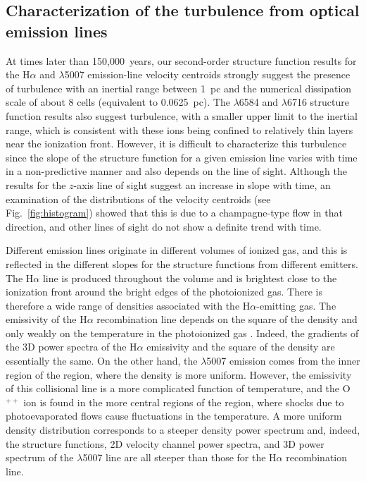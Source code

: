 \documentclass[useAMS,usenatbib]{mn2e}
\begin{document}
\subsection{Characterization of the turbulence from optical emission
  lines}
\label{subsec:charac}
At times later than 150,000~years, our second-order structure function
results for the H$\alpha$ and \oiii$\lambda$5007
emission-line velocity centroids strongly suggest the presence of
turbulence with an inertial range between 1~pc and the numerical
dissipation scale of about 8 cells (equivalent to 0.0625~pc). The
\nii$\lambda$6584 and
\sii$\lambda$6716 structure function results also suggest turbulence, with a smaller upper limit to the inertial range,
which is consistent with these ions being confined to relatively thin
layers near the ionization front. However, it is difficult
to characterize this turbulence since the slope of the structure
function for a given emission line varies with time in a
non-predictive manner and also depends on the line of sight. Although
the results for the $z$-axis line of sight suggest an increase in
slope with time, an examination of the distributions of the velocity centroids
(see Fig.~\ref{fig:histogram}) showed that this is due to a champagne-type
flow in that direction, and other lines of sight do not show a
definite trend with time.

Different emission lines originate in different volumes of ionized
gas, and this is reflected in the different slopes for the structure
functions from different emitters. The H$\alpha$ line is produced
throughout the volume and is brightest close to the ionization front
around the bright edges of the photoionized gas. There is therefore a
wide range of densities associated with the H$\alpha$-emitting
gas. The emissivity of the H$\alpha$ recombination line depends on the
square of the density and only weakly on the temperature in the
photoionized gas \citep[see e.g.,][]{2006agna.book.....O}. Indeed, the
gradients of the 3D power spectra of the H$\alpha$ emissivity and
the square of the density are essentially the same. On the other hand,
the \oiii$\lambda$5007 emission comes from the inner region of the
\hii{} region, where the density is more uniform. However, the emissivity
of this collisional line is a more complicated function of
temperature, and the O$^{++}$ ion is found in the more central regions
of the \hii{} region, where shocks due to photoevaporated flows cause
fluctuations in the temperature. A more uniform density distribution
corresponds to a steeper density power spectrum and, indeed, the
structure functions, 2D velocity channel power spectra, and 3D power
spectrum of the \oiii$\lambda$5007 line are all steeper than those
for the H$\alpha$ recombination line.
\end{document}
